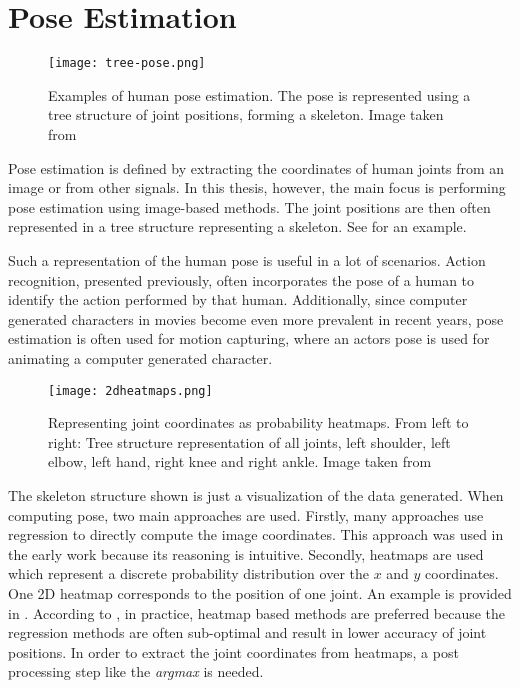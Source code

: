 \section{Pose Estimation}

\begin{figure}[htb!]
    \centering
    \texttt{[image: tree-pose.png]}
    \caption{Examples of human pose estimation. The pose is represented using a tree structure of joint positions, forming a skeleton. Image taken from \cite{newell_stacked_2016}}
    \label{fig:tree-skeleton}
\end{figure}

Pose estimation is defined by extracting the coordinates of human joints from an image or from other signals.
In this thesis, however, the main focus is performing pose estimation using image-based methods.
The joint positions are then often represented in a tree structure representing a skeleton.
See  for an example.

Such a representation of the human pose is useful in a lot of scenarios.
Action recognition, presented previously, often incorporates the pose of a human to identify the action performed by that human.
Additionally, since computer generated characters in movies become even more prevalent in recent years, pose estimation is often used for motion capturing, where an actors pose is used for animating a computer generated character.

\begin{figure}[htb!]
    \centering
    \texttt{[image: 2dheatmaps.png]}
    \caption{Representing joint coordinates as probability heatmaps. From left to right: Tree structure representation of all joints, left shoulder, left elbow, left hand, right knee and right ankle. Image taken from \cite{newell_stacked_2016}}
    \label{fig:probability-heatmaps}
\end{figure}

The skeleton structure shown is just a visualization of the data generated.
When computing pose, two main approaches are used.
Firstly, many approaches use regression to directly compute the image coordinates.
This approach was used in the early work because its reasoning is intuitive.
Secondly, heatmaps are used which represent a discrete probability distribution over the $x$ and $y$ coordinates.
One 2D heatmap corresponds to the position of one joint.
An example is provided in .
According to \cite{luvizon_2d/3d_2018}, in practice, heatmap based methods are preferred because the regression methods are often sub-optimal and result in lower accuracy of joint positions.
In order to extract the joint coordinates from heatmaps, a post processing step like the \textit{argmax} is needed.

